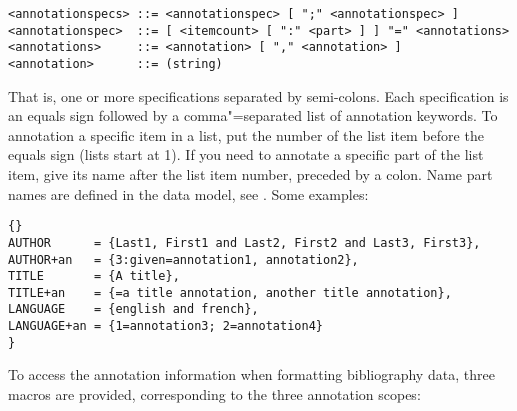 \documentclass{ltxdockit}[2011/03/25]
\begin{document}
\begin{lstlisting}
<annotationspecs> ::= <annotationspec> [ ";" <annotationspec> ]
<annotationspec>  ::= [ <itemcount> [ ":" <part> ] ] "=" <annotations>
<annotations>     ::= <annotation> [ "," <annotation> ]
<annotation>      ::= (string)
\end{lstlisting}
%
That is, one or more specifications separated by semi-colons. Each specification is an equals sign followed by a comma"=separated list of annotation keywords. To annotation a specific item in a list, put the number of the list item before the equals sign (lists start at 1). If you need to annotate a specific part of the list item, give its name after the list item number, preceded by a colon. Name part names are defined in the data model, see . Some examples:

\begin{lstlisting}[style=bibtex]{}
AUTHOR      = {Last1, First1 and Last2, First2 and Last3, First3},
AUTHOR+an   = {3:given=annotation1, annotation2},
TITLE       = {A title},
TITLE+an    = {=a title annotation, another title annotation},
LANGUAGE    = {english and french},
LANGUAGE+an = {1=annotation3; 2=annotation4}
}
\end{lstlisting}
%
To access the annotation information when formatting bibliography data, three macros are provided, corresponding to the three annotation scopes:
\end{document}
